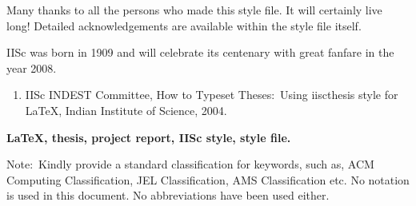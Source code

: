 \begin{frontmatter}
Many thanks to all the persons who made this style file. It will certainly
live long! Detailed acknowledgements are available within the style file itself.

\vita
IISc was born in 1909 and will celebrate its centenary with great fanfare
in the year 2008.
\publications

\begin{enumerate}
\item IISc INDEST Committee,  How to Typeset Theses:~Using iiscthesis
style for \LaTeX, Indian Institute of Science, 2004.
\end{enumerate}

\begin{abstract}
\sl
	This manual tells   you how  to use the  {\tt iiscthes} style to
produce professional  theses (Ph.D., M.Sc.(Engg)  or  M.E.   reports).
This style is a modification of the  standard \LaTeX\ report style. 
This document is written using the {\tt iiscthes} style itself.
	
\end{abstract}

\makecontents

\keywords
{\large\bf{
LaTeX, thesis, project report, IISc style, style file.
}}

\vspace{10MM}

\noindent
Note:~Kindly provide a standard classification for keywords, such as,
ACM Computing Classification, JEL Classification, AMS Classification etc.
\notations
	No notation is used in this document. No abbreviations have been
used either.
\end{frontmatter}
